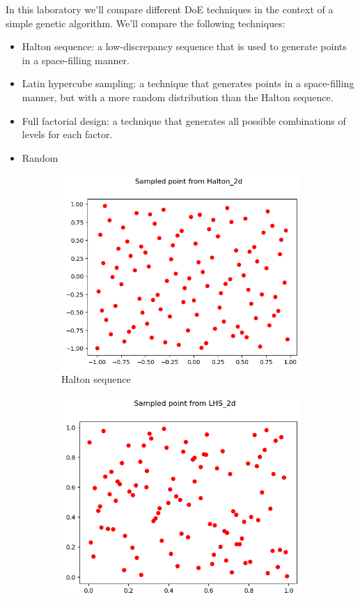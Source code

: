 In this laboratory we'll compare different DoE techniques in the context of a simple genetic algorithm. We'll compare the following techniques:
\begin{itemize}
    \item Halton sequence: a low-discrepancy sequence that is used to generate points in a space-filling manner.
    \item Latin hypercube sampling: a technique that generates points in a space-filling manner, but with a more random distribution than the Halton sequence.
    \item Full factorial design: a technique that generates all possible combinations of levels for each factor.
    \item Random
\end{itemize}

\begin{figure}[H]
    \begin{subfigure}{0.5\textwidth}
        \includegraphics[width=\textwidth]{lab9/imgs/halton.png}
        \caption{Halton sequence}
    \end{subfigure}
    \begin{subfigure}{0.5\textwidth}
        \includegraphics[width=\textwidth]{lab9/imgs/lhs.png}

\end{subfigure}
\end{figure}
